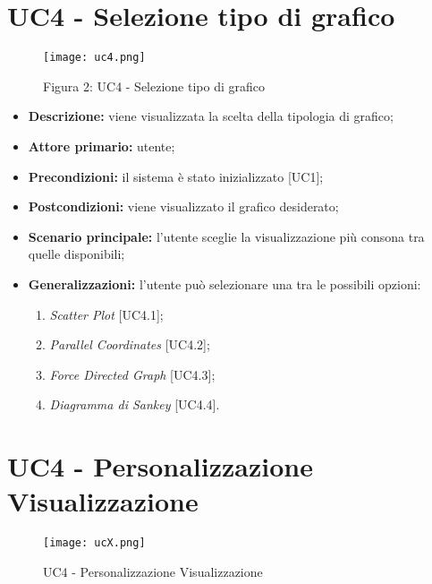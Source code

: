\section{UC4 - Selezione tipo di grafico}
\begin{figure}[H]
 \texttt{[image: uc4.png]}
 \vspace{-5mm}
 \caption*{Figura 2: UC4 - Selezione tipo di grafico}
\end{figure}

 \begin{itemize}
     \item \textbf{Descrizione:} viene visualizzata la scelta della tipologia di grafico;
     \item \textbf{Attore primario:} utente;
     \item \textbf{Precondizioni:} il sistema è stato inizializzato [UC1];
     \item \textbf{Postcondizioni:} viene visualizzato il grafico desiderato;
     \item \textbf{Scenario principale:} l'utente sceglie la visualizzazione più consona tra quelle disponibili;
     \item \textbf{Generalizzazioni:} l'utente può selezionare una tra le possibili opzioni:
     \begin{enumerate}
         \item \textit{Scatter Plot} [UC4.1];
         \item \textit{Parallel Coordinates} [UC4.2];
         \item \textit{Force Directed Graph} [UC4.3];
         \item \textit{Diagramma di Sankey} [UC4.4].
     \end{enumerate}
 \end{itemize}


\section{UC4 - Personalizzazione Visualizzazione}

\begin{figure}[ht]
  \centering
  \texttt{[image: ucX.png]}
  \caption{UC4 - Personalizzazione Visualizzazione}
\end{figure}

